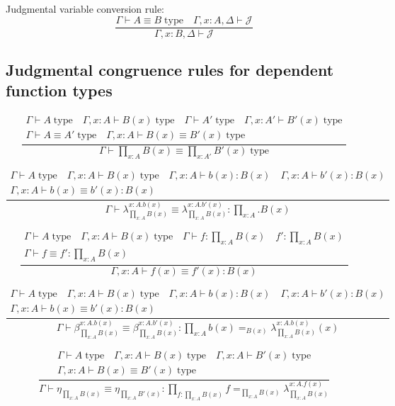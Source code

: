 \documentclass{book}
\begin{document}
Judgmental variable conversion rule:
$$\frac{\Gamma \vdash A \equiv B \; \mathrm{type} \quad \Gamma, x:A, \Delta \vdash \mathcal{J}}{\Gamma, x:B, \Delta \vdash \mathcal{J}}$$

\subsection{Judgmental congruence rules for dependent function types}
$$\frac{
\begin{array}{c}
	\Gamma \vdash A \; \mathrm{type} \quad \Gamma, x:A \vdash B(x) \; \mathrm{type} \quad \Gamma \vdash A' \; \mathrm{type} \quad \Gamma, x:A' \vdash B'(x) \; \mathrm{type} \\
	\Gamma \vdash A \equiv A' \; \mathrm{type} \quad \Gamma, x:A \vdash B(x) \equiv B'(x) \; \mathrm{type}
\end{array}
}{\Gamma \vdash \prod_{x:A} B(x) \equiv \prod_{x:A'} B'(x)\; \mathrm{type}}$$

$$\frac{
\begin{array}{c}
	\Gamma \vdash A \; \mathrm{type} \quad \Gamma, x:A \vdash B(x) \; \mathrm{type} \quad \Gamma, x:A \vdash b(x):B(x) \quad \Gamma, x:A \vdash b'(x):B(x) \\ 
	\Gamma, x:A \vdash b(x) \equiv b'(x):B(x)
\end{array}
}{\Gamma \vdash \lambda_{\prod_{x:A} B(x)}^{x:A.b(x)} \equiv \lambda_{\prod_{x:A} B(x)}^{x:A.b'(x)}:\prod_{x:A}.B(x)}$$

$$\frac{
\begin{array}{c}
	\Gamma \vdash A \; \mathrm{type} \quad \Gamma, x:A \vdash B(x) \; \mathrm{type} \quad \Gamma \vdash f:\prod_{x:A} B(x) \quad f':\prod_{x:A} B(x) \\
	\Gamma \vdash f \equiv f':\prod_{x:A} B(x)
\end{array}
}{\Gamma, x:A \vdash f(x) \equiv f'(x):B(x)}$$

$$\frac{
\begin{array}{c}
	\Gamma \vdash A \; \mathrm{type} \quad \Gamma, x:A \vdash B(x) \; \mathrm{type} \quad \Gamma, x:A \vdash b(x):B(x) \quad \Gamma, x:A \vdash b'(x):B(x) \\ 
	\Gamma, x:A \vdash b(x) \equiv b'(x):B(x)
\end{array}
}{\Gamma \vdash \beta_{\prod_{x:A} B(x)}^{x:A.b(x)} \equiv \beta_{\prod_{x:A} B(x)}^{x:A.b'(x)}:\prod_{x:A} b(x) =_{B(x)} \lambda_{\prod_{x:A} B(x)}^{x:A.b(x)}(x)}$$

$$\frac{
\begin{array}{c}
	\Gamma \vdash A \; \mathrm{type} \quad \Gamma, x:A \vdash B(x) \; \mathrm{type} \quad \Gamma, x:A \vdash B'(x) \; \mathrm{type} \\
	\Gamma, x:A \vdash B(x) \equiv B'(x) \; \mathrm{type}
\end{array}
}{\Gamma \vdash \eta_{\prod_{x:A} B(x)} \equiv \eta_{\prod_{x:A} B'(x)}:\prod_{f:\prod_{x:A} B(x)} f =_{\prod_{x:A} B(x)} \lambda_{\prod_{x:A} B(x)}^{x:A.f(x)}}$$
\end{document}
